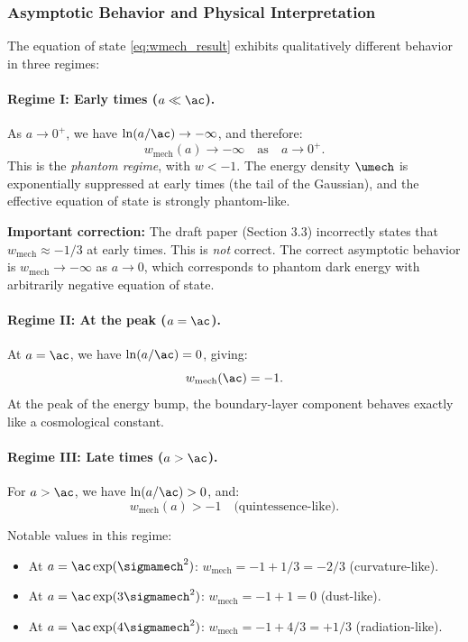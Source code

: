 \subsubsection{Asymptotic Behavior and Physical Interpretation}

The equation of state \eqref{eq:wmech_result} exhibits qualitatively different behavior in three regimes:

\paragraph{Regime I: Early times ($a \ll \ac$).}
As $a \to 0^+$, we have $\ln(a/\ac) \to -\infty$, and therefore:
\begin{equation}
w_{\mathrm{mech}}(a) \to -\infty \quad \text{as} \quad a \to 0^+.
\end{equation}
This is the \emph{phantom regime}, with $w < -1$. The energy density $\umech$ is exponentially suppressed at early times (the tail of the Gaussian), and the effective equation of state is strongly phantom-like.

\textbf{Important correction:} The draft paper (Section 3.3) incorrectly states that $w_{\mathrm{mech}} \approx -1/3$ at early times. This is \emph{not} correct. The correct asymptotic behavior is $w_{\mathrm{mech}} \to -\infty$ as $a \to 0$, which corresponds to phantom dark energy with arbitrarily negative equation of state.

\paragraph{Regime II: At the peak ($a = \ac$).}
At $a = \ac$, we have $\ln(a/\ac) = 0$, giving:
\begin{equation}
w_{\mathrm{mech}}(\ac) = -1.
\end{equation}
At the peak of the energy bump, the boundary-layer component behaves exactly like a cosmological constant.

\paragraph{Regime III: Late times ($a > \ac$).}
For $a > \ac$, we have $\ln(a/\ac) > 0$, and:
\begin{equation}
w_{\mathrm{mech}}(a) > -1 \quad \text{(quintessence-like)}.
\end{equation}

Notable values in this regime:
\begin{itemize}
    \item At $a = \ac \exp(\sigmamech^2)$: $w_{\mathrm{mech}} = -1 + 1/3 = -2/3$ (curvature-like).
    \item At $a = \ac \exp(3\sigmamech^2)$: $w_{\mathrm{mech}} = -1 + 1 = 0$ (dust-like).
    \item At $a = \ac \exp(4\sigmamech^2)$: $w_{\mathrm{mech}} = -1 + 4/3 = +1/3$ (radiation-like).
\end{itemize}

